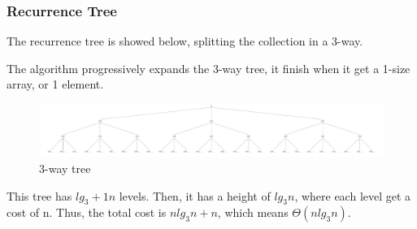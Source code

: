 \subsubsection{Recurrence Tree}

The recurrence tree is showed below, splitting the collection in a 3-way.

The algorithm progressively expands the 3-way tree, it finish when it get a 1-size array, or 1 element.

\begin{figure}[h]
    \includegraphics[scale=0.22]{sections/1warm_up/figures/tree.png}
    \caption{3-way tree}
    \centering
\end{figure}

This tree has $lg_3 + 1n$ levels. Then, it has a height of $lg_3 n$, where each level get a cost of n. Thus, the total cost is $n lg_3 n + n$, which means $\Theta(n lg_3 n)$.